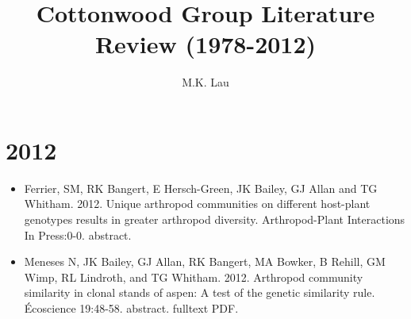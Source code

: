 \documentclass[12pt]{article}
\title{Cottonwood Group Literature Review (1978-2012)}
\author{M.K. Lau}
\begin{document}
\maketitle

\setcounter{tocdepth}{3}  %
\tableofcontents

\section{2012}
\begin{itemize}
\item Ferrier, SM, RK Bangert, E Hersch-Green, JK Bailey, GJ Allan and TG
Whitham. 2012. Unique arthropod communities on different host-plant
genotypes results in greater arthropod diversity. Arthropod-Plant
Interactions In Press:0-0. abstract.

\item Meneses N, JK Bailey, GJ Allan, RK Bangert, MA Bowker, B Rehill, GM
Wimp, RL Lindroth, and TG Whitham. 2012. Arthropod community
similarity in clonal stands of aspen: A test of the genetic similarity
rule. Écoscience 19:48-58. abstract. fulltext PDF.
\end{itemize}
\end{document}
